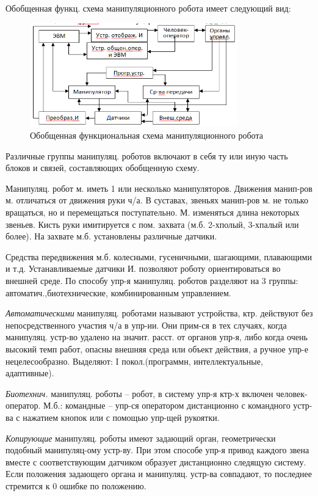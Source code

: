 \documentclass[unicode, 12pt, a4paper, oneside]{article}
\begin{document}
Обобщенная функц. схема манипуляционного робота имеет следующий вид:
\begin{figure}[H]
\centering
\includegraphics[width=0.8\textwidth]{44_Manipul_robot.png}
\caption{Обобщенная функциональная схема манипуляционного робота}
\end{figure}

Различные группы манипуляц. роботов включают в себя ту или иную часть блоков и связей, составляющих обобщенную схему.

Манипуляц. робот м. иметь 1 или несколько манипуляторов. Движения манип-ров м. отличаться от движения руки ч/а. В суставах, звеньях манип-ров м. не только вращаться, но и перемещаться поступательно. М. изменяться длина некоторых звеньев. Кисть руки имитируется с пом. захвата (м.б. 2-хполый, 3-хпалый или более). На захвате м.б. установлены различные датчики.

Средства передвижения м.б. колесными, гусеничными, шагающими, плавающими и т.д.
Устанавливаемые датчики И. позволяют роботу ориентироваться во внешней среде.
По способу упр-я манипуляц. роботов разделяют на 3 группы: автоматич.,биотехнические, комбинированным управлением.

\textit{Автоматическими} манипуляц. роботами называют  устройства, ктр. действуют без непосредственного участия ч/а в упр-ии. Они прим-ся в тех случаях, когда манипуляц. устр-во удалено на значит. расст. от органов упр-я, либо когда очень высокий темп работ, опасны внешняя среда или объект действия, а ручное упр-е нецелесообразно.
Выделяют: I покол.(программн, интеллектуальные, адаптивные).

\textit{Биотехнич.} манипуляц. роботы – робот, в систему упр-я ктр-х включен человек-оператор. М.б.: командные – упр-ся оператором дистанционно с командного устр-ва с нажатием кнопок или с помощью упр-щей рукоятки.

\textit{Копирующие} манипуляц. роботы имеют задающий орган, геометрически подобный манипуляц-ому устр-ву. При этом способе упр-я привод каждого звена вместе с соответствующим датчиком образует дистанционно следящую систему. Если положения задающего органа и манипуляц. устр-ва совпадают, то последнее стремится к 0 ошибке по положению.
\end{document}
